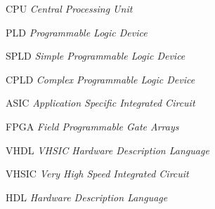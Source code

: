 \begin{siglas}
    \item[{CPU}]{\textit{\textit{Central Processing Unit }}}
    \item[{PLD}]{\textit{\textit{Programmable Logic Device}}}
    \item[{SPLD}]{\textit{\textit{Simple Programmable Logic Device}}}
    \item[{CPLD}]{\textit{\textit{Complex Programmable Logic Device}}}
    \item[{ASIC}]{\textit{\textit{Application Specific Integrated Circuit}}}
    \item[{FPGA}]{\textit{\textit{Field Programmable Gate Arrays}}}
    \item[{VHDL}]{\textit{\textit{VHSIC Hardware Description Language}}}
    \item[{VHSIC}]{\textit{\textit{Very High Speed Integrated Circuit}}}
    \item[{HDL}]{\textit{\textit{Hardware Description Language}}}
\end{siglas}


